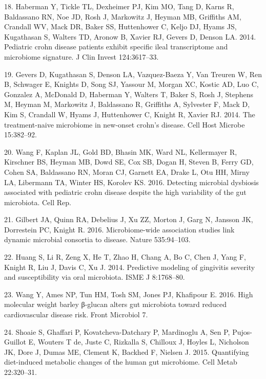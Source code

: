 \documentclass[11pt,]{article}
\begin{document}
\hypertarget{ref-haberman_pedsCD_2014}{}
18. Haberman Y, Tickle TL, Dexheimer PJ, Kim MO, Tang D, Karns R,
Baldassano RN, Noe JD, Rosh J, Markowitz J, Heyman MB, Griffiths AM,
Crandall WV, Mack DR, Baker SS, Huttenhower C, Keljo DJ, Hyams JS,
Kugathasan S, Walters TD, Aronow B, Xavier RJ, Gevers D, Denson LA.
2014. Pediatric crohn disease patients exhibit specific ileal
transcriptome and microbiome signature. J Clin Invest 124:3617--33.

\hypertarget{ref-gevers_pedsCD_2014}{}
19. Gevers D, Kugathasan S, Denson LA, Vazquez-Baeza Y, Van Treuren W,
Ren B, Schwager E, Knights D, Song SJ, Yassour M, Morgan XC, Kostic AD,
Luo C, Gonzalez A, McDonald D, Haberman Y, Walters T, Baker S, Rosh J,
Stephens M, Heyman M, Markowitz J, Baldassano R, Griffiths A, Sylvester
F, Mack D, Kim S, Crandall W, Hyams J, Huttenhower C, Knight R, Xavier
RJ. 2014. The treatment-naive microbiome in new-onset crohn's disease.
Cell Host Microbe 15:382--92.

\hypertarget{ref-wang_pedsCD_2016}{}
20. Wang F, Kaplan JL, Gold BD, Bhasin MK, Ward NL, Kellermayer R,
Kirschner BS, Heyman MB, Dowd SE, Cox SB, Dogan H, Steven B, Ferry GD,
Cohen SA, Baldassano RN, Moran CJ, Garnett EA, Drake L, Otu HH, Mirny
LA, Libermann TA, Winter HS, Korolev KS. 2016. Detecting microbial
dysbiosis associated with pediatric crohn disease despite the high
variability of the gut microbiota. Cell Rep.

\hypertarget{ref-Gilbert_diseases_2016}{}
21. Gilbert JA, Quinn RA, Debelius J, Xu ZZ, Morton J, Garg N, Jansson
JK, Dorrestein PC, Knight R. 2016. Microbiome-wide association studies
link dynamic microbial consortia to disease. Nature 535:94--103.

\hypertarget{ref-Huang_gingivitis_2014}{}
22. Huang S, Li R, Zeng X, He T, Zhao H, Chang A, Bo C, Chen J, Yang F,
Knight R, Liu J, Davis C, Xu J. 2014. Predictive modeling of gingivitis
severity and susceptibility via oral microbiota. ISME J 8:1768--80.

\hypertarget{ref-Wang_cvdrisk_2016}{}
23. Wang Y, Ames NP, Tun HM, Tosh SM, Jones PJ, Khafipour E. 2016. High
molecular weight barley β-glucan alters gut microbiota toward reduced
cardiovascular disease risk. Front Microbiol 7.

\hypertarget{ref-Shoaie_diet_2015}{}
24. Shoaie S, Ghaffari P, Kovatcheva-Datchary P, Mardinoglu A, Sen P,
Pujos-Guillot E, Wouters T de, Juste C, Rizkalla S, Chilloux J, Hoyles
L, Nicholson JK, Dore J, Dumas ME, Clement K, Backhed F, Nielsen J.
2015. Quantifying diet-induced metabolic changes of the human gut
microbiome. Cell Metab 22:320--31.
\end{document}

